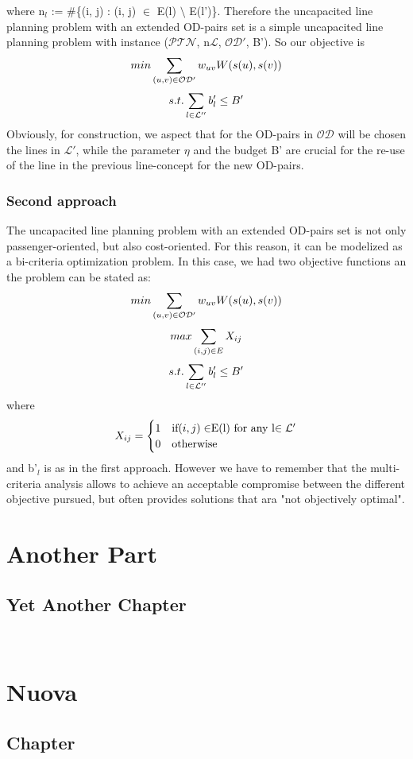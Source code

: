 \documentclass[
  twoside,
  12pt, a4paper,
  footinclude=true,
  headinclude=true,
  cleardoublepage=empty
]{scrbook}
\theoremstyle{definition}
\begin{document}
where n$_l$ := \#\{(i, j) : (i, j) $\in$ E(l) $\setminus$ E(l')\}. \newline
Therefore the uncapacited line planning problem with an extended OD-pairs set is a simple uncapacited line planning problem with instance ($\mathcal{PTN}$, n$\mathcal{L}$, $\mathcal{OD'}$, B'). So our objective is 
\begin{equation} \notag
min \sum_{(u,v)\in\mathcal{OD'}} w_{uv}W(s(u), s(v))
\end{equation}
\begin{equation} \notag
s.t. \sum_{l\in\mathcal{L''}} b'_l \le B'
\end{equation}
Obviously, for construction, we aspect that for the OD-pairs in $\mathcal{OD}$ will be chosen the lines in $\mathcal{L'}$, while the parameter $\eta$ and the budget B' are crucial for the re-use of the line in the previous line-concept  for the new OD-pairs.
\section{Second approach} 
The uncapacited line planning problem with an extended OD-pairs set is not only passenger-oriented, but also cost-oriented. For this reason, it can be modelized as a bi-criteria optimization problem. \newline
In this case, we had two objective functions an the problem can be stated as:
\begin{equation} \notag
min \sum_{(u,v)\in\mathcal{OD'}} w_{uv}W(s(u), s(v))
\end{equation}
\begin{equation} \notag
max \sum_{(i,j)\in E} X_{ij}
\end{equation}
\begin{equation} \notag
s.t. \sum_{l\in\mathcal{L''}} b'_l \le B'
\end{equation}
where 
\[X_{ij}=
\begin{cases}
1 & $if$ (i, j) \in $E(l) for any l$ \in \mathcal{L'} \\
0 & $otherwise$
\end{cases}
\]
and b'$_l$ is as in the first approach. \newline
However we have to remember that the multi-criteria analysis allows to achieve an acceptable compromise between the different objective pursued, but often provides solutions that ara "not objectively optimal".




\part{Another Part}

\chapter{Yet Another Chapter}

\
\part{Nuova}
\chapter{ Chapter}

    
\end{document}
